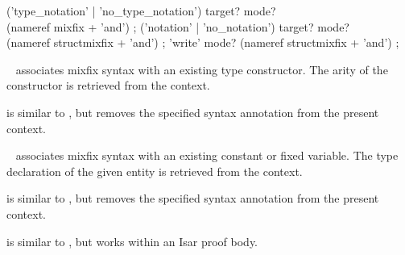 \begin{isabellebody}
\begin{isamarkuptext}
  \begin{rail}
    ('type_notation' | 'no_type_notation') target? mode? \\ (nameref mixfix + 'and')
    ;
    ('notation' | 'no_notation') target? mode? \\ (nameref structmixfix + 'and')
    ;
    'write' mode? (nameref structmixfix + 'and')
    ;
  \end{rail}

  \begin{description}

  \item \hyperlink{command.type-notation}{\mbox{}}~ associates mixfix
  syntax with an existing type constructor.  The arity of the
  constructor is retrieved from the context.
  
  \item \hyperlink{command.no-type-notation}{\mbox{}} is similar to \hyperlink{command.type-notation}{\mbox{}}, but removes the specified syntax annotation from
  the present context.

  \item \hyperlink{command.notation}{\mbox{}}~ associates mixfix
  syntax with an existing constant or fixed variable.  The type
  declaration of the given entity is retrieved from the context.
  
  \item \hyperlink{command.no-notation}{\mbox{}} is similar to \hyperlink{command.notation}{\mbox{}},
  but removes the specified syntax annotation from the present
  context.

  \item \hyperlink{command.write}{\mbox{}} is similar to \hyperlink{command.notation}{\mbox{}}, but
  works within an Isar proof body.

  \end{description}


\end{isamarkuptext}
\end{isabellebody}
